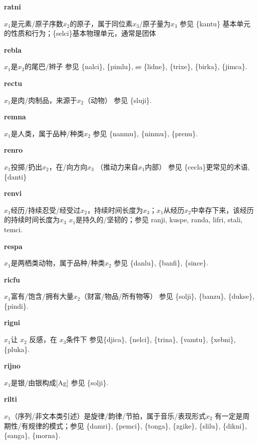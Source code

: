 \documentclass[notitlepage,twocolumn,a4paper,10pt]{book}
\begin{document}
{\sffamily\bfseries ratni}\enspace {\ttfamily\bfseries[rat]}  $x_1$是元素\slash{}原子序数$x_2$的原子，属于同位素$x_3$\slash{}原子量为$x_3$ \textemdash{} 参见 \{kantu\} 基本单元的性质和行为；\{selci\}基本物理单元，通常是团体

{\sffamily\bfseries rebla}\enspace {\ttfamily\bfseries[reb]}  $x_1$是$x_2$的尾巴\slash{}辫子 \textemdash{} 参见 \{nalci\}, \{pimlu\}, se \{lidne\}, \{trixe\}, \{birka\}, \{jimca\}.

{\sffamily\bfseries rectu}\enspace {\ttfamily\bfseries[rec     re'u]}  $x_1$是肉\slash{}肉制品，来源于$x_2$（动物） \textemdash{} 参见 \{sluji\}.

{\sffamily\bfseries remna}\enspace {\ttfamily\bfseries[rem     re'a]}  $x_1$是人类，属于品种\slash{}种类$x_2$ \textemdash{} 参见 \{nanmu\}, \{ninmu\}, \{prenu\}.

{\sffamily\bfseries renro}\enspace {\ttfamily\bfseries[rer     re'o]}  $x_1$投掷\slash{}扔出$x_2$，在\slash{}向方向$x_3$ （推动力来自$x_1$内部） \textemdash{} 参见 \{cecla\}更常见的术语, \{danti\}

{\sffamily\bfseries renvi}\enspace {\ttfamily\bfseries[rev     re'i]}  $x_1$经历\slash{}持续忍受\slash{}经受过$x_2$，持续时间长度为$x_3$；$x_1$从经历$x_2$中幸存下来，该经历的持续时间长度为$x_3$ \textemdash{} $x_1$是持久的\slash{}坚韧的；参见 {ranji}, {kuspe}, {randa}, {lifri}, {stali}, {temci}.

{\sffamily\bfseries respa}\enspace {\ttfamily\bfseries[res]}  $x_1$是两栖类动物，属于品种\slash{}种类$x_2$ \textemdash{} 参见 \{danlu\}, \{banfi\}, \{since\}.

{\sffamily\bfseries ricfu}  $x_1$富有\slash{}饱含\slash{}拥有大量$x_2$（财富\slash{}物品\slash{}所有物等） \textemdash{} 参见 \{solji\}, \{banzu\}, \{dukse\}, \{pindi\}.

{\sffamily\bfseries rigni}\enspace {\ttfamily\bfseries[rig]}  $x_{1}$让 $x_{2}$ 反感，在 $x_{3}$条件下 \textemdash{} 参见\{djica\}, \{nelci\}, \{trina\}, \{vamtu\}, \{xebni\}, \{pluka\}.

{\sffamily\bfseries rijno}\enspace {\ttfamily\bfseries[rij]}  $x_1$是银\slash{}由银构成[Ag] \textemdash{} 参见 \{solji\}.

{\sffamily\bfseries rilti}\enspace {\ttfamily\bfseries[ril]}  $x_1$（序列\slash{}非文本类引述）是旋律\slash{}韵律\slash{}节拍，属于音乐\slash{}表现形式$x_2$ \textemdash{} 有一定是周期性\slash{}有规律的模式；参见 \{damri\}, \{pemci\}, \{tonga\}, \{zgike\}, \{slilu\}, \{dikni\}, \{sanga\}, \{morna\}.
\end{document}
